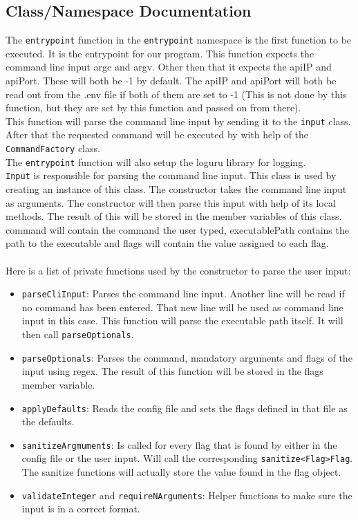 \documentclass[../Main.tex]{subfiles}
\begin{document}
\subsection{Class/Namespace Documentation}


The \texttt{entrypoint} function in the \texttt{entrypoint} namespace is the first function to be executed. It is the entrypoint for our program. This function expects the command line input argc and argv. Other then that it expects the apiIP and apiPort. These will both be -1 by default. The apiIP and apiPort will both be read out from the .env file if both of them are set to -1 (This is not done by this function, but they are set by this function and passed on from there).\\
This function will parse the command line input by sending it to the \texttt{input} class. After that the requested command will be executed by with help of the \texttt{CommandFactory} class.\\
The \texttt{entrypoint} function will also setup the loguru library for logging.\\

\texttt{Input} is responsible for parsing the command line input. This class is used by creating an instance of this class. The constructor takes the command line input as arguments. The constructor will then parse this input with help of its local methods. The result of this will be stored in the member variables of this class. command will contain the command the user typed, executablePath contains the path to the executable and flags will contain the value assigned to each flag.\\\\
Here is a list of private functions used by the constructor to parse the user input:
\begin{itemize}
    \item \texttt{parseCliInput}: Parses the command line input. Another line will be read if no command has been entered. That new line will be used as command line input in this case. This function will parse the executable path itself. It will then call \texttt{parseOptionals}.
    \item \texttt{parseOptionals}: Parses the command, mandatory arguments and flags of the input using regex. The result of this function will be stored in the flags member variable.
    \item \texttt{applyDefaults}: Reads the config file and sets the flags defined in that file as the defaults.
    \item \texttt{sanitizeArgmuments}: Is called for every flag that is found by either in the config file or the user input. Will call the corresponding \texttt{sanitize<Flag>Flag}. The sanitize functions will actually store the value found in the flag object.
    \item \texttt{validateInteger} and \texttt{requireNArguments}: Helper functions to make sure the input is in a correct format.
\end{itemize}
\end{document}
